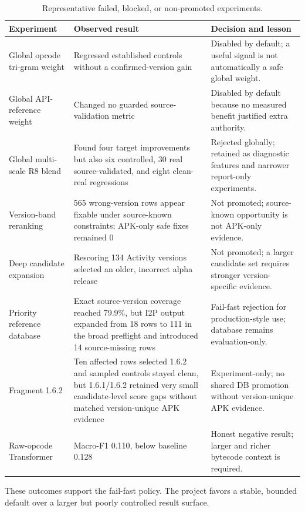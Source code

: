 \begin{table}[H]
\centering
\caption{Representative failed, blocked, or non-promoted experiments.}
\label{tab:pfe-failed-experiments}
\begin{tabularx}{\textwidth}{L{0.23\textwidth}L{0.23\textwidth}X}
\toprule
\textbf{Experiment} & \textbf{Observed result} & \textbf{Decision and lesson}\\
\midrule
Global opcode tri-gram weight & Regressed established controls without a
confirmed-version gain & Disabled by default; a useful signal is not
automatically a safe global weight.\\
Global API-reference weight & Changed no guarded source-validation metric &
Disabled by default because no measured benefit justified extra authority.\\
Global multi-scale R8 blend & Found four target improvements but also six
controlled, 30 real source-validated, and eight clean-real regressions &
Rejected globally; retained as diagnostic features and narrower report-only
experiments.\\
Version-band reranking & 565 wrong-version rows appear fixable under
source-known constraints; APK-only safe fixes remained 0 & Not promoted;
source-known opportunity is not APK-only evidence.\\
Deep candidate expansion & Rescoring 134 Activity versions selected an older,
incorrect alpha release & Not promoted; a larger candidate set requires
stronger version-specific evidence.\\
Priority reference database & Exact source-version coverage reached 79.9\%,
but I2P output expanded from 18 rows to 111 in the broad preflight and
introduced 14 source-missing rows & Fail-fast rejection for production-style
use; database remains evaluation-only.\\
Fragment 1.6.2 & Ten affected rows selected 1.6.2 and sampled controls stayed
clean, but 1.6.1/1.6.2 retained very small candidate-level score gaps without
matched version-unique APK evidence &
Experiment-only; no shared DB promotion without version-unique APK evidence.\\
Raw-opcode Transformer & Macro-F1 0.110, below baseline 0.128 & Honest
negative result; larger and richer bytecode context is required.\\
\bottomrule
\end{tabularx}
\end{table}

These outcomes support the fail-fast policy. The project favors a stable,
bounded default over a larger but poorly controlled result surface.

